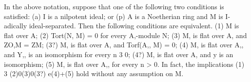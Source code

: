 \begin{theorem}[Theorem 22.3]\label{mcrt-auto-theorem-22-3}
\begin{mathematicalrecord}
In the above notation, suppose that one of the following
two conditions is satisfied:
    (a) I is a nilpotent ideal;
or (p) A is a Noetherian ring and M is I-adically ideal-separated. Then
the following conditions are equivalent.
   (1) M is flat over A;
   (2) Tort(N, M) = 0 for every A,-module N;
   (3) M, is flat over A, and ZO,M = ZM;
   (3?) M, is flat over A, and Torf(A,, M) = 0;
   (4) M, is flat over A,, and Y,, is an isomorphism for every n 3 0;
   (4?) M, is flat over A, and y is an isomorphism;
   (5) M, is flat over A,, for every n > 0.
   In fact, the implications (1) 3 (2)0(3)0(3?)   e(4)+(5) hold without any
assumption on M.
\end{mathematicalrecord}
\end{theorem}
